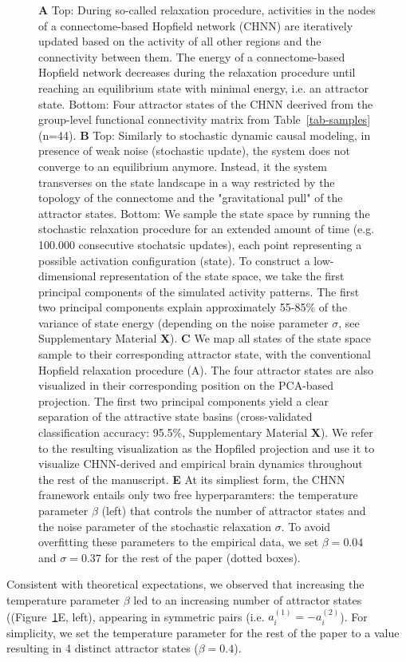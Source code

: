 \documentclass{article}
\begin{document}
\begin{figure}[!htbp]
{\textbf{A} Top: During so-called relaxation procedure, activities in the nodes of a connectome-based Hopfield network (CHNN)
are iteratively updated based on the activity of all other regions and the connectivity between them. The energy of a
connectome-based Hopfield network decreases during the relaxation procedure until reaching an equilibrium state with
minimal energy, i.e. an attractor state. Bottom: Four attractor states of the CHNN deerived from the
group-level functional connectivity matrix from Table~\ref{tab-samples} (n=44).
\textbf{B} Top: Similarly to stochastic dynamic causal modeling, in presence of weak noise (stochastic update), the system
does not converge to an equilibrium anymore. Instead, it the system transverses on the state landscape in a way
restricted by the topology of the connectome and the "gravitational pull" of the attractor states. Bottom: We sample
the state space by running the stochastic relaxation procedure for an extended amount of time (e.g. 100.000 consecutive
stochatsic updates), each point representing a possible activation configuration (state). To construct a
low-dimensional representation of the state space, we take the first principal components of the simulated activity
patterns. The first two principal components explain approximately 55-85\% of the variance of state energy (depending
on the noise parameter $\sigma$, see Supplementary Material \textbf{X}).
\textbf{C} We map all states of the state space sample to their corresponding attractor state, with the conventional
Hopfield relaxation procedure (A). The four attractor states are also visualized in their corresponding position on the
PCA-based projection. The first two principal components yield a clear separation of the attractive state basins
(cross-validated classification accuracy: 95.5\%, Supplementary Material \textbf{X}). We refer to the resulting visualization
as the Hopfiled projection and use it to visualize CHNN-derived and empirical brain dynamics throughout the rest of
the manuscript.
\textbf{E} At its simpliest form, the CHNN framework entails only two free hyperparamters: the temperature parameter
$\beta$ (left) that controls the number of attractor states and the noise parameter of the stochastic relaxation
$\sigma$. To avoid overfitting these parameters to the empirical data, we set $\beta=0.04$ and $\sigma=0.37$ for the
rest of the paper  (dotted boxes).}
\label{attractors}
\end{figure}

Consistent with theoretical expectations, we observed that increasing the temperature parameter $\beta$ led to an
increasing number of attractor states ((Figure~\ref{attractors}E, left), appearing in symmetric pairs
(i.e. $a_i^{(1)} = -a_i^{(2)}$). For simplicity, we set the temperature parameter for the rest of the paper to a value
resulting in 4 distinct attractor states ($\beta=0.4$).
\end{document}
